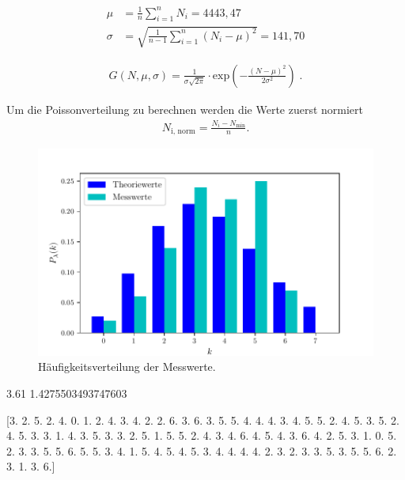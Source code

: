 \begin{align*}
  \mu &= \frac{1}{n} \sum_{i=1}^n N_i = 4443,47\\
  \sigma &= \sqrt{ \frac{1}{n-1} \sum_{i=1}^n (N_i - \mu)^2  } =141,70
\end{align*}

\begin{align*}
  G(N, \mu, \sigma) = \frac{1}{\sigma \sqrt{2 \pi}} \cdot \text{exp} \left(- \frac{(N - \mu)^2}{2 \sigma^2} \right) \; .
\end{align*}

Um die Poissonverteilung zu berechnen werden die Werte zuerst normiert
\begin{align*}
  N_\text{i, norm} = \frac{N_i - N_\text{min}}{n}.
\end{align*}


\begin{figure}[H]
  \centering
  \includegraphics[width=\textwidth]{build/poisson.pdf}
  \caption {Häufigkeitsverteilung der Messwerte.}
  \label{fig:poisson}
\end{figure}

3.61 1.4275503493747603

[3. 2. 5. 2. 4. 0. 1. 2. 4. 3. 4. 2. 2. 6. 3. 6. 3. 5. 5. 4. 4. 4. 3. 4.
 5. 5. 2. 4. 5. 3. 5. 2. 4. 5. 3. 3. 1. 4. 3. 5. 3. 3. 2. 5. 1. 5. 5. 2.
 4. 3. 4. 6. 4. 5. 4. 3. 6. 4. 2. 5. 3. 1. 0. 5. 2. 3. 3. 5. 5. 6. 5. 5.
 3. 4. 1. 5. 4. 5. 4. 5. 3. 4. 4. 4. 4. 2. 3. 2. 3. 3. 5. 3. 5. 5. 6. 2.
 3. 1. 3. 6.]